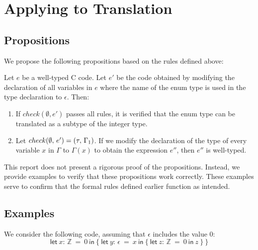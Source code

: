 \documentclass[10pt,conference]{IEEEtran}
\newcommand{\Z}{\ensuremath{\mathbb{Z}}}
\newcommand{\lett}[4]{\ensuremath{\mathsf{let}\ #1\mathsf{:}\,#2\ \mathsf{=}\ #3\ \mathsf{in}\ #4}}
\begin{document}
\section{Applying to Translation}

\subsection{Propositions}

We propose the following propositions based on the rules defined above:


Let $e$ be a well-typed C code. Let $e'$ be the code obtained by modifying the declaration of all variables in $e$ where the name of the enum type is used in the type declaration to $\epsilon$. Then:
\begin{enumerate}
    \item If $check(\emptyset, e')$ passes all rules, it is verified that the enum type can be translated as a subtype of the integer type.
    \item Let ${check}(\emptyset,\,e')=(\tau,\,\Gamma_1)$. If we modify the declaration of the type of every variable $x$ in $\Gamma$ to $\Gamma(x)$ to obtain the expression $e''$, then $e''$ is well-typed.
\end{enumerate}

This report does not present a rigorous proof of the propositions. Instead, we provide examples to verify that these propositions work correctly. These examples serve to confirm that the formal rules defined earlier function as intended.

\subsection{Examples}

We consider the following code, assuming that $\epsilon$ includes the value 0:
\[
\lett{x}{\Z}{0}{
    \{\ \lett{y}{\epsilon}{x}{\{\ 
        \lett{z}{\Z}{0}{z}
    \ \}}\ \}
}\]
\end{document}
